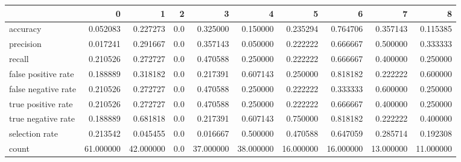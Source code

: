 \begin{tabular}{lrrrrrrrrr}
\toprule
{} &          0 &          1 &    2 &          3 &          4 &          5 &          6 &          7 &          8 \\
\midrule
accuracy            &   0.052083 &   0.227273 &  0.0 &   0.325000 &   0.150000 &   0.235294 &   0.764706 &   0.357143 &   0.115385 \\
precision           &   0.017241 &   0.291667 &  0.0 &   0.357143 &   0.050000 &   0.222222 &   0.666667 &   0.500000 &   0.333333 \\
recall              &   0.210526 &   0.272727 &  0.0 &   0.470588 &   0.250000 &   0.222222 &   0.666667 &   0.400000 &   0.250000 \\
false positive rate &   0.188889 &   0.318182 &  0.0 &   0.217391 &   0.607143 &   0.250000 &   0.818182 &   0.222222 &   0.600000 \\
false negative rate &   0.210526 &   0.272727 &  0.0 &   0.470588 &   0.250000 &   0.222222 &   0.333333 &   0.600000 &   0.250000 \\
true positive rate  &   0.210526 &   0.272727 &  0.0 &   0.470588 &   0.250000 &   0.222222 &   0.666667 &   0.400000 &   0.250000 \\
true negative rate  &   0.188889 &   0.681818 &  0.0 &   0.217391 &   0.607143 &   0.750000 &   0.818182 &   0.222222 &   0.400000 \\
selection rate      &   0.213542 &   0.045455 &  0.0 &   0.016667 &   0.500000 &   0.470588 &   0.647059 &   0.285714 &   0.192308 \\
count               &  61.000000 &  42.000000 &  0.0 &  37.000000 &  38.000000 &  16.000000 &  16.000000 &  13.000000 &  11.000000 \\
\bottomrule
\end{tabular}
